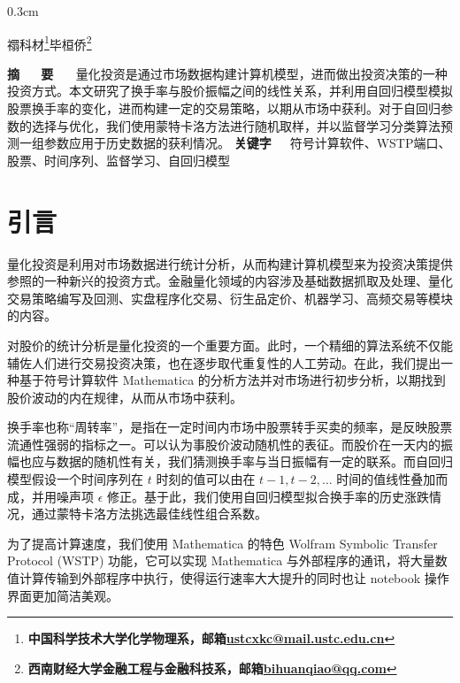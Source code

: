 \documentclass{ctexart}
\newcommand{\0}{\boldsymbol{0}}
\newcommand{\setparDis}{\setlength{\parskip} {0.3cm} }
\begin{document}
\nocite{*}
\setparDis

\begin{center}
    {\kaishu {}}

    \vspace{12pt}

    \fontsize{13.75pt}{0}禤科材\footnote[1]{\textbf{中国科学技术大学化学物理系，邮箱\;\href{mailto:ustcxkc@mail.ustc.edu.cn}{ustcxkc@mail.ustc.edu.cn}\label{ustc}}}\;\;毕桓侨\footnote[2]{\textbf{西南财经大学金融工程与金融科技系，邮箱\;\href{mailto:bihuanqiao@qq.com}{bihuanqiao@qq.com}\label{sfu}}}

\end{center}

\noindent\textbf{摘~~~\!要}~~~\!
量化投资是通过市场数据构建计算机模型，进而做出投资决策的一种投资方式。本文研究了换手率与股价振幅之间的线性关系，并利用自回归模型模拟股票换手率的变化，进而构建一定的交易策略，以期从市场中获利。对于自回归参数的选择与优化，我们使用蒙特卡洛方法进行随机取样，并以监督学习分类算法预测一组参数应用于历史数据的获利情况。
\newline
\textbf{关键字}~~~\!符号计算软件、WSTP端口、股票、时间序列、监督学习、自回归模型


\fontsize{12pt}{18pt}

\section{引言}

量化投资是利用对市场数据进行统计分析，从而构建计算机模型来为投资决策提供参照的一种新兴的投资方式。金融量化领域的内容涉及基础数据抓取及处理、量化交易策略编写及回测、实盘程序化交易、衍生品定价、机器学习、高频交易等模块的内容。

对股价的统计分析是量化投资的一个重要方面。此时，一个精细的算法系统不仅能辅佐人们进行交易投资决策，也在逐步取代重复性的人工劳动。在此，我们提出一种基于符号计算软件 Mathematica 的分析方法并对市场进行初步分析，以期找到股价波动的内在规律，从而从市场中获利。

换手率也称“周转率”，是指在一定时间内市场中股票转手买卖的频率，是反映股票流通性强弱的指标之一。可以认为事股价波动随机性的表征。而股价在一天内的振幅也应与数据的随机性有关，我们猜测换手率与当日振幅有一定的联系。而自回归模型假设一个时间序列在 $t$ 时刻的值可以由在 $t-1,t-2,\dots $ 时间的值线性叠加而成，并用噪声项 $\epsilon $ 修正。基于此，我们使用自回归模型拟合换手率的历史涨跌情况，通过蒙特卡洛方法挑选最佳线性组合系数。

为了提高计算速度，我们使用 Mathematica 的特色 Wolfram Symbolic Transfer Protocol (WSTP) 功能，它可以实现 Mathematica 与外部程序的通讯，将大量数值计算传输到外部程序中执行，使得运行速率大大提升的同时也让 notebook 操作界面更加简洁美观。
\end{document}
